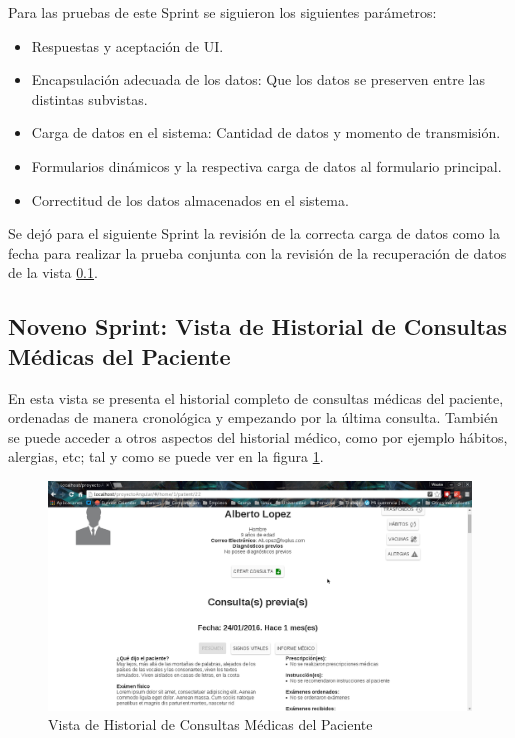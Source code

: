     Para las pruebas de este Sprint se siguieron los siguientes parámetros:
    
    \begin{itemize}
        \item Respuestas y aceptación de UI.
        \item Encapsulación adecuada de los datos: Que los datos se preserven entre las distintas subvistas.
        \item Carga de datos en el sistema: Cantidad de datos y momento de transmisión.
        \item Formularios dinámicos y la respectiva carga de datos al formulario principal.
        \item Correctitud de los datos almacenados en el sistema.
    \end{itemize}
    
    Se dejó para el siguiente Sprint la revisión de la correcta carga de datos como la fecha para realizar la prueba conjunta con la revisión de la recuperación de datos de la vista \ref{historial-medico}.
    
    \subsection{Noveno Sprint: Vista de Historial de Consultas Médicas del Paciente}
    \label{historial-medico}
    
    En esta vista se presenta el historial completo de consultas médicas del paciente, ordenadas de manera cronológica y empezando por la última consulta. También se puede acceder a otros aspectos del historial médico, como por ejemplo hábitos, alergias, etc; tal y como se puede ver en la figura \ref{consultas}.
    
    \begin{figure}[htbp!]
        \begin{center}
            \includegraphics[width=.9\textwidth]{figures/p11}
        \end{center}
        \caption{Vista de Historial de Consultas Médicas del Paciente}
        \label{consultas}
    \end{figure}
    
